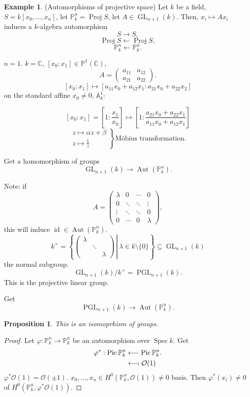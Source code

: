\documentclass[12pt]{article}
\DeclareMathOperator{\id}{id}
\DeclareMathOperator{\Spec}{Spec}
\DeclareMathOperator{\Proj}{Proj}
\DeclareMathOperator{\GL}{GL}
\DeclareMathOperator{\PGL}{PGL}
\DeclareMathOperator{\Pic}{Pic}
\DeclareMathOperator{\Aut}{Aut}
\newtheorem*{proposition}{Proposition}
\theoremstyle{definition}
\newtheorem*{example}{Example}
\begin{document}
\begin{example}
(Automorphisms of projective space) Let $k$ be a field, $S=k[x_0,\ldots,x_n]$, let $\mathbb P_k^n=\Proj S$, let $A\in\GL_{n+1}(k)$. Then, $x_i\mapsto Ax_i$ induces a $k$-algebra automorphism
\[S\longrightarrow S,\]
\[\Proj S\longleftarrow\Proj S,\]
\[\mathbb P_k^n\longleftarrow\mathbb P_k^n.\]

$n=1$. $k=\mathbb C$, $[x_0:x_1]\in\mathbb P^1(\mathbb C)$,
\[A=\left(\begin{matrix}a_{11}&a_{12}\\a_{21}&a_{22}\end{matrix}\right).\]
\[[x_0:x_1]\longmapsto[a_{11}x_0+a_{12}x_1:a_{21}x_0+a_{22}x_2]\]
on the standard affine $x_0\neq0$, $\mathbb A_k^1$:

\[[x_0:x_1]=\left[1:\frac{x_1}{x_0}\right]\longmapsto\left[1:\frac{a_{21}x_0+a_{22}x_1}{a_{11}x_0+a_{12}x_1}\right]\]
\[\left.\begin{array}{l}z\longmapsto\alpha z+\beta\\z\longmapsto\frac1z\end{array}\right\}\text{M\"obius transformation.}\]

Get a homomorphism of groups
\[\GL_{n+1}(k)\longrightarrow\Aut(\mathbb P_k^n).\]

Note: if
\[A=\left(\begin{matrix}\lambda&0&\cdots&0\\0&\ddots&\ddots&\vdots\\\vdots&\ddots&\ddots&0\\0&\cdots&0&\lambda\end{matrix}\right),\]
this will induce $\id\in\Aut(\mathbb P_k^n)$.
\[k^\times=\left\{\left.\left(\begin{matrix}\lambda\\&\ddots\\&&\lambda\end{matrix}\right)\,\right|\,\lambda\in k\setminus\{0\}\right\}\subseteq\GL_{n+1}(k)\]
the normal subgroup.
\[\GL_{n+1}(k)/k^\times=\PGL_{n+1}(k).\]
This is the projective linear group.

Get
\[\PGL_{n+1}(k)\longrightarrow\Aut(\mathbb P_k^n).\]

\begin{proposition}
This is an isomoprhism of groups.
\end{proposition}

\begin{proof}
Let $\varphi:\mathbb P_k^n\rightarrow\mathbb P_k^n$ be an automorphism over $\Spec k$. Get
\begin{align*}
\varphi^*:\Pic\mathbb P_k^n&\longleftarrow\Pic\mathbb P_k^n.\\&\longleftarrow\!\shortmid\mathcal O(1)
\end{align*}
$\varphi^*\mathcal O(1)=\mathcal O(\pm1)$. $x_0,\ldots,x_n\in H^0(\mathbb P_k^n,\mathcal O(1))\neq0$ basis. Then $\varphi^*(x_i)\neq0$ of $H^0(\mathbb P_k^n,\varphi^*\mathcal O(1))$.


\end{proof}
\end{example}
\end{document}
